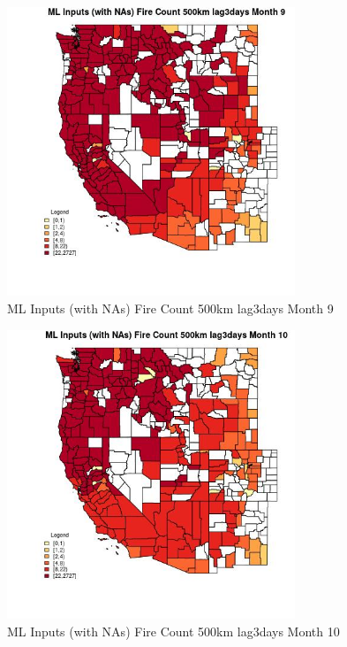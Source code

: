 \begin{figure} 
\centering  
\includegraphics[width=0.77\textwidth]{Code_Outputs/Report_ML_input_PM25_Step4_part_f_de_duplicated_aveswNAs_CountyFire_Count_500km_lag3daysmedianMonth9.jpg} 
\caption{\label{fig:Report_ML_input_PM25_Step4_part_f_de_duplicated_aveswNAsCountyFire_Count_500km_lag3daysmedianMonth9}ML Inputs (with NAs) Fire Count 500km lag3days Month 9} 
\end{figure} 
 

\begin{figure} 
\centering  
\includegraphics[width=0.77\textwidth]{Code_Outputs/Report_ML_input_PM25_Step4_part_f_de_duplicated_aveswNAs_CountyFire_Count_500km_lag3daysmedianMonth10.jpg} 
\caption{\label{fig:Report_ML_input_PM25_Step4_part_f_de_duplicated_aveswNAsCountyFire_Count_500km_lag3daysmedianMonth10}ML Inputs (with NAs) Fire Count 500km lag3days Month 10} 
\end{figure} 
 


